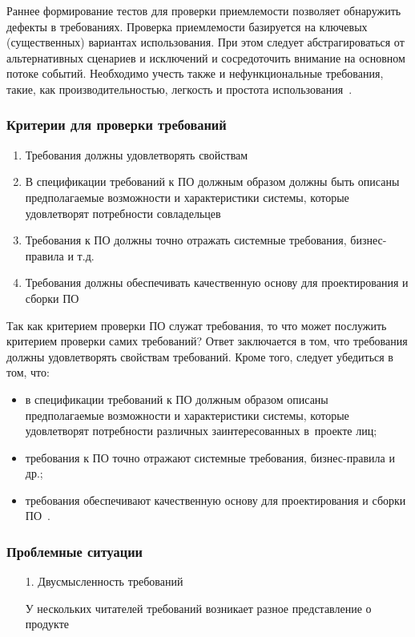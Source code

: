 \documentclass{../industrial-development}
\begin{document}
{Раннее формирование тестов для проверки приемлемости позволяет обнаружить дефекты в требованиях. Проверка приемлемости базируется на ключевых (существенных) вариантах использования. При этом следует абстрагироваться от альтернативных сценариев и исключений и сосредоточить внимание на основном потоке событий. Необходимо учесть также и нефункциональные требования, такие, как производительностью, легкость и простота использования~\cite[с.~68]{Maglinec}.


\begin{frame} \frametitle {Критерии для проверки требований}
\begin{enumerate}
\item Требования должны удовлетворять свойствам
\item В спецификации требований к ПО должным образом должны быть описаны предполагаемые возможности и характеристики системы, которые удовлетворят потребности совладельцев
\item Требования к ПО должны точно отражать системные требования, бизнес-правила и т.д.
\item Требования должны обеспечивать качественную основу для проектирования и сборки ПО
\end{enumerate}
\end{frame}

\lecturenotes

Так как критерием проверки ПО служат требования, то что может послужить критерием проверки самих требований? Ответ заключается в том, что требования должны удовлетворять свойствам требований. Кроме того, следует убедиться в том, что:
\begin{itemize}
\item в спецификации требований к ПО должным образом описаны предполагаемые возможности и характеристики системы, которые удовлетворят потребности различных заинтересованных в~проекте лиц;
\item требования к ПО точно отражают системные требования, бизнес-правила и др.;
\item требования обеспечивают качественную основу для проектирования и сборки ПО~\cite[с.~64]{Maglinec}.
\end{itemize}


\begin{frame} \frametitle {Проблемные ситуации}
\begin{itemize}
\item[1.] Двусмысленность требований

{\small У нескольких читателей требований возникает разное представление о продукте}


\end{itemize}
\end{frame}}
\end{document}
